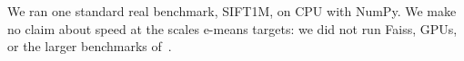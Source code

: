 We ran one standard real benchmark, SIFT1M, on CPU with NumPy. We make no claim about speed at the scales e-means targets: we did not run Faiss, GPUs, or the larger benchmarks of~\cite{bessa2026}.